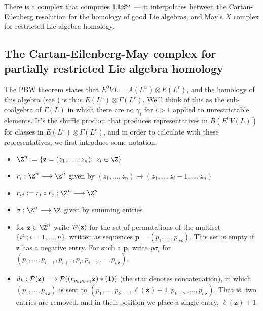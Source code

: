 \documentclass[10pt]{article}
\newcommand{\PRLie}[1]{\scrR^{#1}}%
\newcommand{\Ind}[2][]{\mathbf{I}{#2}_{#1}}%
\newcommand{\derived}{\mathbb{L}}
\begin{document}
\begin{DerivedFunctorsLowDimension}
There is a complex that computes $\derived\Ind{\PRLie{n}}$ --- it interpolates between the Cartan-Eilenberg resolution for the homology of good Lie algebras, and May's $\overline{X}$ complex for  restricted Lie algebra homology.
\end{DerivedFunctorsLowDimension}

\begin{PRlieKoszulComplexCalculation}

\subsection{The Cartan-Eilenberg-May complex for partially restricted Lie algebra homology}
The PBW theorem states that $E^0VL=A(L^u)\otimes E(L^r)$, and the homology of this algebra (see \cite[\S7]{PriddyKoszul.pdf}) is thus $E(L^u)\otimes \Gamma(L^r)$. We'll think of this as the sub-coalgebra of $\Gamma(L)$ in which there are no $\gamma_i$ for $i>1$ applied to unrestrictable elements. It's the shuffle product that produces representatives in $\overline{B}(E^0V(L))$ for classes in $E(L^u)\otimes \Gamma(L^r)$, and in order to calculate with these representatives, we first introduce some notation.
\begin{itemize}
\setlength{\parindent}{.25in}
\item $\Z^n:=\{\textbf{z}=(z_1,\ldots,z_n);\ z_i\in\Z\}$
\item $r_i:\Z^n\to\Z^n$ given by $(z_1,\ldots,z_n)\mapsto(z_1,\ldots,z_i-1,\ldots,z_n)$
\item $r_{ij}:=r_i\circ r_j:\Z^n\to\Z^n$
\item $\sigma:\Z^n\to\Z$ given by summing entries
\item for $\textbf{z}\in\Z^n$ write $\mathcal{P}(\textbf{z})$ for the set of permutations of the multiset $\{i^{z_i};i=1,\ldots,n\}$, written as sequences $\textbf{p}=(p_1,\ldots,p_{\sigma \textbf{z}})$. This set is empty if $\textbf{z}$ has a negative entry. For such a $\textbf{p}$, write $p\sigma_i$ for $(p_1,\ldots,p_{i-1},p_{i+1},p_{i},p_{i+2},\ldots,p_{\sigma \textbf{z}})$.
\item $d_k:\mathcal{P}(\textbf{z})\longrightarrow\mathcal{P}((r_{p_kp_{k+1}}\textbf{z})*(1))$ (the star denotes concatenation), in which $(p_1,\ldots,p_{\sigma \textbf{z}})$ is sent to $(p_1,\ldots,p_{k-1},\ell(\textbf{z})+1,p_{k+2},\ldots,p_{\sigma \textbf{z}})$. That is, two entries are removed, and in their position we place a single entry, $\ell(\textbf{z})+1$.
\end{itemize}
\begin{prop}

\end{prop}
\end{PRlieKoszulComplexCalculation}
\end{document}
